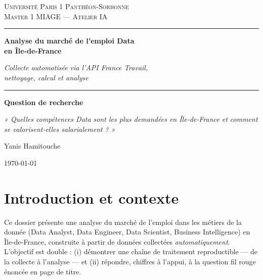 \documentclass[11pt,a4paper]{article}
\begin{document}
\begin{titlepage}
\centering
\vspace*{2cm}
{\small\scshape Université Paris 1 Panthéon-Sorbonne \\ Master 1 MIAGE — Atelier IA\par}
\vspace{2.5cm}
{\color{bleu}\rule{\linewidth}{1.2pt}\par}
\vspace{0.6cm}
{\Huge\bfseries Analyse du marché de l'emploi Data\\[0.3cm] en Île-de-France\par}
\vspace{0.5cm}
{\large\itshape Collecte automatisée via l'API France Travail,\\ nettoyage, calcul et analyse\par}
\vspace{0.4cm}
{\color{bleu}\rule{\linewidth}{1.2pt}\par}
\vspace{2cm}
{\large\textbf{Question de recherche}\par}
\vspace{0.3cm}
\begin{minipage}{0.85\linewidth}\centering\itshape
« Quelles compétences Data sont les plus demandées en Île-de-France
et comment se valorisent-elles salarialement ? »
\end{minipage}
\vfill
{\large Yanis Hamitouche \quad\textbullet{}\par}
\vspace{0.5cm}
{\large \today\par}
\end{titlepage}

\tableofcontents
\thispagestyle{empty}
\clearpage

\section{Introduction et contexte}

Ce dossier présente une analyse du marché de l'emploi dans les métiers de la
donnée (Data Analyst, Data Engineer, Data Scientist, Business Intelligence) en
Île-de-France, construite à partir de données collectées \emph{automatiquement}.
L'objectif est double : (i) démontrer une chaîne de traitement reproductible — de
la collecte à l'analyse — et (ii) répondre, chiffres à l'appui, à la question fil
rouge énoncée en page de titre.
\end{document}
